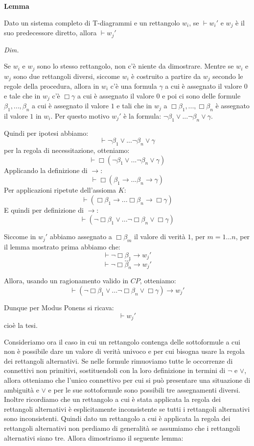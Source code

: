 \documentclass[a4paper, titlepage, 12pt]{report}
\begin{document}
\begin{flushleft}
\textbf{Lemma}

Dato un sistema completo di T-diagrammi e un rettangolo $w_i$, se $\vdash w_i'$
e $w_j$ è il suo predecessore diretto,
allora $\vdash w_j'$

\textit{Dim.}

Se $w_i$ e $w_j$ sono lo stesso rettangolo, non c'è niente da dimostrare.
Mentre se $w_i$ e $w_j$ sono due rettangoli diversi, siccome $w_i$ è costruito
a partire da $w_j$ secondo le regole della procedura, allora in $w_i$ c'è
una formula $\gamma$ a cui è assegnato il valore $0$ e tale che in $w_j$ c'è
$\Box \gamma$ a cui è assegnato il valore $0$ e poi ci sono delle formule
$\beta_1, ..., \beta_n$ a cui è assegnato il valore $1$ e tali che in $w_j$
a $\Box \beta_1, ..., \Box \beta_n$ è assegnato il valore $1$ in $w_i$.
Per questo motivo $w_j'$ è la formula: $\neg \beta_1 \lor ... \neg \beta_n \lor \gamma$.

Quindi per ipotesi abbiamo:
$$\vdash \neg \beta_1 \lor ... \neg \beta_n \lor \gamma$$
per la regola di necessitazione, otteniamo:
$$\vdash \Box(\neg \beta_1 \lor ... \neg \beta_n \lor \gamma)$$
Applicando la definizione di $\rightarrow$:
$$\vdash \Box(\beta_1 \rightarrow ... \beta_n \rightarrow \gamma)$$
Per applicazioni ripetute dell'assioma $K$:
$$\vdash (\Box \beta_1 \rightarrow ... \Box \beta_n \rightarrow \Box \gamma)$$
E quindi per definizione di $\rightarrow$:
$$\vdash (\neg \Box \beta_1 \lor ... \neg \Box \beta_n \lor \Box \gamma)$$

Siccome in $w_j'$ abbiamo assegnato a $\Box \beta_m$ il valore di verità $1$, per $m = 1...n$,
per il lemma mostrato prima abbiamo che:
$$\vdash \neg \Box \beta_1 \rightarrow w_j'$$
$$...$$
$$\vdash \neg \Box \beta_n \rightarrow w_j'$$

Allora, usando un ragionamento valido in $CP$, otteniamo:
$$\vdash (\neg \Box \beta_1 \lor ... \neg \Box \beta_n \lor \Box \gamma) \rightarrow w_j'$$

Dunque per Modus Ponens si ricava:
$$\vdash w_j'$$
cioè la tesi.

\end{flushleft}

Consideriamo ora il caso in cui un rettangolo contenga delle sottoformule
a cui non è possibile dare un valore di verità univoco e per cui bisogna
usare la regola dei rettangoli alternativi. Se nelle formule rimuoviamo
tutte le occorrenze di connettivi non primitivi, sostituendoli con la loro definizione
in termini di $\neg$ e $\lor$, allora otteniamo che l'unico connettivo
per cui si può presentare una situazione di ambiguità e $\lor$ e per le sue sottoformule
sono possibili tre assegnamenti diversi. Inoltre ricordiamo che un rettangolo a cui è stata applicata
la regola dei rettangoli alternativi è esplicitamente inconsistente se tutti i
rettangoli alternativi sono inconsistenti. Quindi dato un rettangolo
a cui è applicata la regola dei rettangoli alternativi non perdiamo di generalità
se assumiamo che i rettangoli alternativi siano tre. Allora dimostriamo il seguente lemma:
\end{document}

